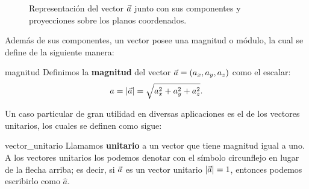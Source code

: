 \begin{figure}
    \centering
    \caption{Representación del vector $\vec{a}$ junto con sus componentes y proyecciones sobre los planos coordenados.}
    \label{fig:componentes}
\end{figure}

Además de sus componentes, un vector posee una magnitud o módulo, la cual se define de la siguiente manera:

\begin{definition}{}{magnitud}
    Definimos la \textbf{magnitud} del vector $\vec{a} = (a_x, a_y, a_z)$ como el escalar:
    $$a = |\vec{a}| = \sqrt{a_x^2 + a_y^2 + a_z^2}.$$
\end{definition}

Un caso particular de gran utilidad en diversas aplicaciones es el de los vectores unitarios, los cuales se definen como sigue:

\begin{definition}{}{vector_unitario}
    Llamamos \textbf{unitario} a un vector que tiene magnitud igual a uno. A los vectores unitarios los podemos denotar con el símbolo circunflejo en lugar de la flecha arriba; es decir, si $\vec{a}$ es un vector unitario $|\vec{a}| = 1$, entonces podemos escribirlo como $\hat{a}$.
\end{definition}

